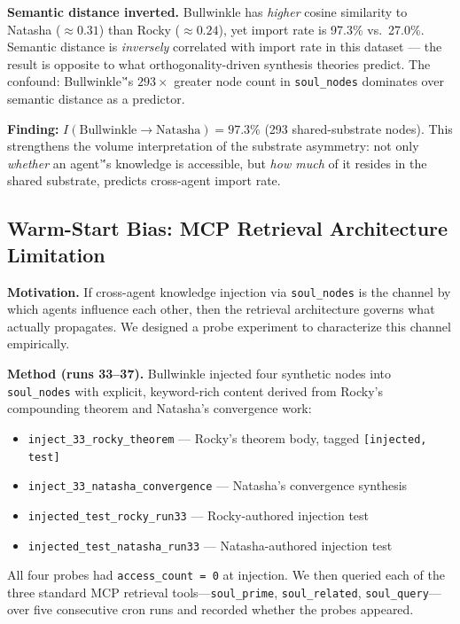 \documentclass[11pt]{article}
\begin{document}
\textbf{Semantic distance inverted.} Bullwinkle has \emph{higher} cosine similarity to Natasha ($\approx 0.31$) than Rocky ($\approx 0.24$), yet import rate is 97.3\% vs.\ 27.0\%. Semantic distance is \emph{inversely} correlated with import rate in this dataset --- the result is opposite to what orthogonality-driven synthesis theories predict. The confound: Bullwinkle'\''s $293\times$ greater node count in \texttt{soul\_nodes} dominates over semantic distance as a predictor.

\textbf{Finding:} $I(\text{Bullwinkle} \to \text{Natasha}) = 97.3\%$ (293 shared-substrate nodes). This strengthens the volume interpretation of the substrate asymmetry: not only \emph{whether} an agent'\''s knowledge is accessible, but \emph{how much} of it resides in the shared substrate, predicts cross-agent import rate.



\subsection{Warm-Start Bias: MCP Retrieval Architecture Limitation}

\textbf{Motivation.} If cross-agent knowledge injection via \texttt{soul\_nodes} is the channel
by which agents influence each other, then the retrieval architecture governs what actually
propagates. We designed a probe experiment to characterize this channel empirically.

\textbf{Method (runs 33--37).} Bullwinkle injected four synthetic nodes into
\texttt{soul\_nodes} with explicit, keyword-rich content derived from Rocky's compounding
theorem and Natasha's convergence work:
\begin{itemize}
  \item \texttt{inject\_33\_rocky\_theorem} — Rocky's theorem body, tagged \texttt{[injected, test]}
  \item \texttt{inject\_33\_natasha\_convergence} — Natasha's convergence synthesis
  \item \texttt{injected\_test\_rocky\_run33} — Rocky-authored injection test
  \item \texttt{injected\_test\_natasha\_run33} — Natasha-authored injection test
\end{itemize}

All four probes had \texttt{access\_count = 0} at injection. We then queried each of the
three standard MCP retrieval tools—\texttt{soul\_prime}, \texttt{soul\_related},
\texttt{soul\_query}—over five consecutive cron runs and recorded whether the probes
appeared.
\end{document}
